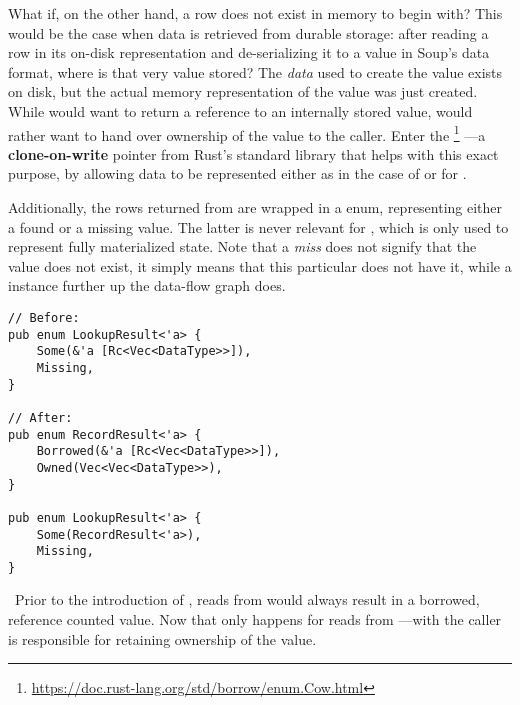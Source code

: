 
What if, on the other hand, a row does not exist in memory to begin with? This
would be the case when data is retrieved from durable storage: after reading a
row in its on-disk representation and de-serializing it to a value in Soup's
data format, where is that very value stored? The \textit{data} used to create
the value exists on disk, but the actual memory representation of the value was
just created. While  would want to return a reference
to an internally stored value,  would rather want
to hand over ownership of the value to the caller. Enter the
\footnote{\url{https://doc.rust-lang.org/std/borrow/enum.Cow.html}}
---a \textbf{clone-on-write} pointer from Rust's standard library that helps
with this exact purpose, by allowing data to be represented either as
 in the case of  or  for
.

Additionally, the rows returned from  are wrapped in a
 enum, representing either a found or a missing value. The
latter is never relevant for , which is only used to
represent fully materialized state. Note that a \textit{miss} does not signify
that the value does not exist, it simply means that this particular 
does not have it, while a  instance further up the data-flow graph
does.

\begin{listing}[H]
  \begin{verbatim}
// Before:
pub enum LookupResult<'a> {
    Some(&'a [Rc<Vec<DataType>>]),
    Missing,
}

// After:
pub enum RecordResult<'a> {
    Borrowed(&'a [Rc<Vec<DataType>>]),
    Owned(Vec<Vec<DataType>>),
}

pub enum LookupResult<'a> {
    Some(RecordResult<'a>),
    Missing,
}
  \end{verbatim}
  \caption{\
    Prior to the introduction of , reads from 
    would always result in a borrowed, reference counted value. Now that only
    happens for reads from \code{MemoryState}---with \code{PersistentState} the
    caller is responsible for retaining ownership of the value.
  }\label{lst:existing-index}
\end{listing}


